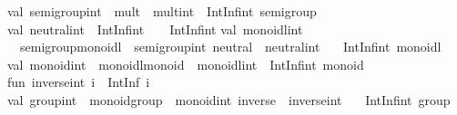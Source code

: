 \begin{isabellebody}
\begin{isamarkuptext}
\isanewline
val\ semigroup{}int\ {}\ {}mult\ {}\ mult{}int{}\ {}\ IntInf{}int\ semigroup{}\isanewline
\isanewline
val\ neutral{}int\ {}\ IntInf{}int\ {}\ {}{}\ {}\ IntInf{}int{}{}\isanewline
\isanewline
val\ monoidl{}int\ {}\isanewline
\ \ {}semigroup{}monoidl\ {}\ semigroup{}int{}\ neutral\ {}\ neutral{}int{}\ {}\isanewline
\ \ IntInf{}int\ monoidl{}\isanewline
\isanewline
val\ monoid{}int\ {}\ {}monoidl{}monoid\ {}\ monoidl{}int{}\ {}\ IntInf{}int\ monoid{}\isanewline
\isanewline
fun\ inverse{}int\ i\ {}\ IntInf{}{}\ i{}\isanewline
\isanewline
val\ group{}int\ {}\ {}monoid{}group\ {}\ monoid{}int{}\ inverse\ {}\ inverse{}int{}\ {}\isanewline
\ \ IntInf{}int\ group{}\isanewline

\end{isamarkuptext}
\end{isabellebody}
